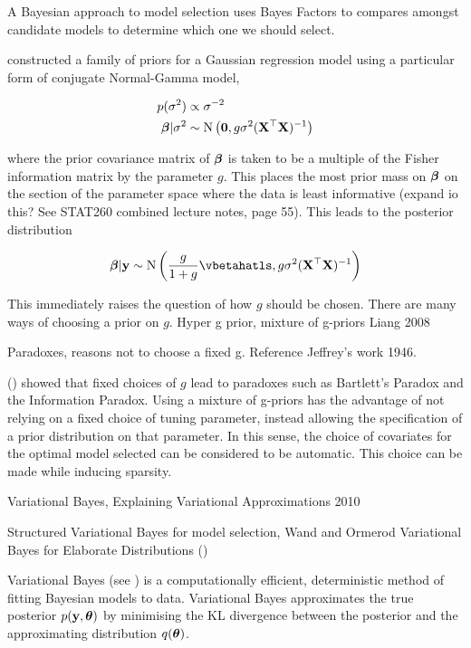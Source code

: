 \documentclass{amsart}[12pt]
\begin{document}
A Bayesian approach to model selection uses Bayes Factors to compares amongst candidate models to determine
which one we should select.


\cite{Goel1986} constructed a family of priors for a Gaussian regression model using a particular form
of conjugate Normal-Gamma model,

\begin{align*}
	p(\sigma^2)     & \propto \sigma^{-2}                                       \\
	{\boldsymbol \beta}|\sigma^2 & \sim \text{N}\left({\bf 0}, g\sigma^2 ({\bf X}^\top {\bf X})^{-1}\right) 
\end{align*}

where the prior covariance matrix of ${\boldsymbol \beta}$ is taken to be a multiple of the Fisher information  matrix by
the parameter $g$. This places the most prior mass on ${\boldsymbol \beta}$ on the section of the parameter space where the
data is least informative (expand io this? See STAT260 combined lecture notes, page 55). This leads to the
posterior distribution

\[
	\vbeta | \vy \sim \N\left(\frac{g}{1+g} \vbetahatls, g \sigma^2 (\mX^\top \mX)^{-1} \right)
\]

This immediately raises the question of how $g$ should be chosen. There are many ways of choosing a prior on
$g$. Hyper g prior, mixture of g-priors Liang 2008

Paradoxes, reasons not to choose a fixed g. Reference Jeffrey's work 1946. \cite{Society2016}

(\cite{Liang2008}) showed that fixed choices of $g$ lead to paradoxes such as Bartlett's Paradox and the
Information Paradox. Using a mixture of g-priors has the advantage of not relying on a fixed choice of tuning
parameter, instead allowing the specification of a prior distribution on that parameter. In this sense, the
choice of covariates for the optimal model selected can be considered to be automatic. This choice can be made
while inducing sparsity.

Variational Bayes, Explaining Variational Approximations 2010

Structured Variational Bayes for model selection, Wand and Ormerod Variational Bayes for Elaborate 
Distributions (\cite{Wand2011})


Variational Bayes (see \cite{Ormerod2010}) is a computationally efficient, deterministic method of fitting
Bayesian models to data. Variational Bayes approximates the true posterior $p({\bf y}, {\boldsymbol \theta})$ by minimising the
KL divergence between the posterior and the  approximating distribution $q({\boldsymbol \theta})$.
\end{document}
